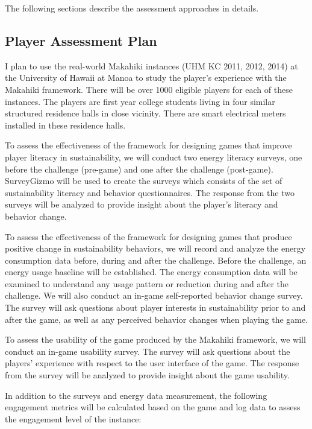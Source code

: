 The following sections describe the assessment approaches in details. 

\subsection{Player Assessment Plan}

I plan to use the real-world Makahiki instances (UHM KC 2011, 2012, 2014) at the University of Hawaii at Manoa to study the player's experience with the Makahiki framework. There will be over 1000 eligible players for each of these instances. The players are first year college students living in four similar structured residence halls in close vicinity. There are smart electrical meters installed in these residence halls.

To assess the effectiveness of the framework for designing games that improve player literacy in sustainability, we will 
conduct two energy literacy surveys, one before the challenge (pre-game) and one after
the challenge (post-game). SurveyGizmo will be used to create the surveys which consists of the set of sustainability literacy and behavior questionnaires. The response from the two surveys will be analyzed to provide insight about the player's literacy and behavior change. 

To assess the effectiveness of the framework for designing games that produce positive change in sustainability
behaviors, we will record and analyze the energy consumption data before, during and after the
challenge.  Before the challenge, an energy usage baseline will be established. The energy consumption data will be examined to understand any usage pattern or reduction during and after the challenge.  We will also conduct an in-game self-reported behavior change survey. The survey will ask questions about player interests in sustainability prior to and after the game, as well as any perceived behavior changes when playing the game. 

To assess the usability of the game produced by the Makahiki framework, we will conduct an in-game usability survey. The survey will ask questions about the players' experience with respect to the user interface of the game. The response from the survey will be analyzed to provide insight about the game usability. 

In addition to the surveys and energy data measurement, the following engagement metrics will be calculated based on the game and log data to assess the engagement level of the instance:

